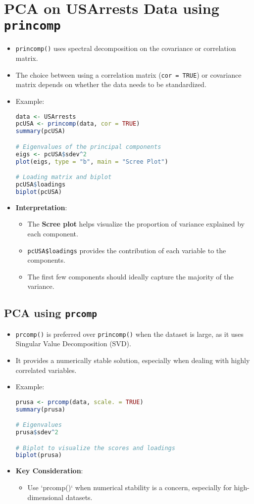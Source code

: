 \section{PCA on USArrests Data using \texttt{princomp}}
\begin{itemize}
    \item \texttt{princomp()} uses spectral decomposition on the covariance or correlation matrix.
    \item The choice between using a correlation matrix (\texttt{cor = TRUE}) or covariance matrix depends on whether the data needs to be standardized.
    \item Example:
\begin{lstlisting}[language=R]
data <- USArrests
pcUSA <- princomp(data, cor = TRUE)
summary(pcUSA)

# Eigenvalues of the principal components
eigs <- pcUSA$sdev^2
plot(eigs, type = "b", main = "Scree Plot")

# Loading matrix and biplot
pcUSA$loadings
biplot(pcUSA)
\end{lstlisting}

\item \textbf{Interpretation}:
    \begin{itemize}
        \item The \textbf{Scree plot} helps visualize the proportion of variance explained by each component.
        \item \texttt{pcUSA\$loadings} provides the contribution of each variable to the components.
        \item The first few components should ideally capture the majority of the variance.
    \end{itemize}
\end{itemize}

\subsection{PCA using \texttt{prcomp}}
\begin{itemize}
    \item \texttt{prcomp()} is preferred over \texttt{princomp()} when the dataset is large, as it uses Singular Value Decomposition (SVD).
    \item It provides a numerically stable solution, especially when dealing with highly correlated variables.
    \item Example:
\begin{lstlisting}[language=R]
prusa <- prcomp(data, scale. = TRUE)
summary(prusa)

# Eigenvalues
prusa$sdev^2

# Biplot to visualize the scores and loadings
biplot(prusa)
\end{lstlisting}
\item \textbf{Key Consideration}:
    \begin{itemize}
        \item Use `prcomp()` when numerical stability is a concern, especially for high-dimensional datasets.
    \end{itemize}
\end{itemize}

